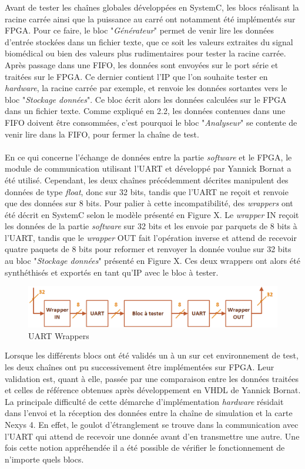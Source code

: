 \documentclass[a4paper,12pt]{article}
\begin{document}
	Avant de tester les chaînes globales développées en SystemC, les blocs réalisant la racine carrée ainsi que la puissance au carré ont notamment été implémentés sur FPGA. Pour ce faire, le bloc "\textit{Générateur}" permet de venir lire les données d'entrée stockées dans un fichier texte, que ce soit les valeurs extraites du signal biomédical ou bien des valeurs plus rudimentaires pour tester la racine carrée. Après passage dans une FIFO, les données sont envoyées sur le port série et traitées sur le FPGA. Ce dernier contient l'IP que l'on souhaite tester en \textit{hardware}, la racine carrée par exemple, et renvoie les données sortantes vers le bloc "\textit{Stockage données}". Ce bloc écrit alors les données calculées sur le FPGA dans un fichier texte. Comme expliqué en 2.2, les données contenues dans une FIFO doivent être consommées, c'est pourquoi le bloc "\textit{Analyseur}" se contente de venir lire dans la FIFO, pour fermer la chaîne de test.  \\ \\
	\indent En ce qui concerne l'échange de données entre la partie \textit{software} et le FPGA, le module de communication utilisant l'UART et développé par Yannick Bornat a été utilisé. Cependant, les deux chaînes précédemment décrites manipulent des données de type \textit{float}, donc sur 32 bits, tandis que l'UART ne reçoit et renvoie que des données sur 8 bits. Pour palier à cette incompatibilité, des \textit{wrappers} ont été décrit en SystemC selon le modèle présenté en Figure X. Le \textit{wrapper} IN reçoit les données de la partie \textit{software} sur 32 bits et les envoie par parquets de 8 bits à l'UART, tandis que le \textit{wrapper} OUT fait l'opération inverse et attend de recevoir quatre paquets de 8 bits pour reformer et renvoyer la donnée voulue sur 32 bits au bloc "\textit{Stockage données}" présenté en Figure X. Ces deux wrappers ont alors été synthéthisés et exportés en tant qu'IP avec le bloc à tester.  
	\begin{figure}[H]
		\centering
		\includegraphics[width=\textwidth]{Dessin7.png}
		\caption{UART Wrappers}
	\end{figure}   

	Lorsque les différents blocs ont été validés un à un sur cet environnement de test, les deux chaînes ont pu successivement être implémentées sur FPGA. Leur validation est, quant à elle, passée par une comparaison entre les données traitées et celles de référence obtenues après développement en VHDL de Yannick Bornat. La principale difficulté de cette démarche d'implémentation \textit{hardware} résidait dans l'envoi et la réception des données entre la chaîne de simulation et la carte Nexys 4. En effet, le goulot d'étranglement se trouve dans la communication avec l'UART qui attend de recevoir une donnée avant d'en transmettre une autre. Une fois cette notion appréhendée il a été possible de vérifier le fonctionnement de n'importe quels blocs.
\newpage
\end{document}
